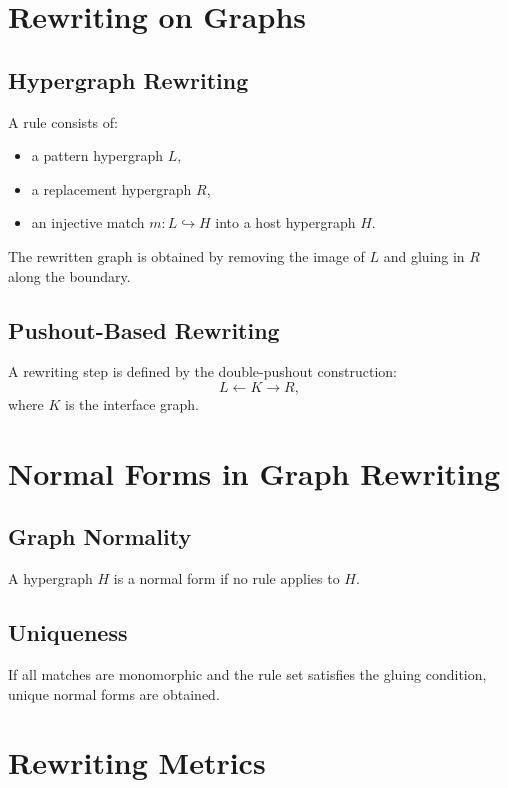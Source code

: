 \section{Rewriting on Graphs}

\subsection{Hypergraph Rewriting}

A rule consists of:
\begin{itemize}
\item a pattern hypergraph $L$,
\item a replacement hypergraph $R$,
\item an injective match $m:L\hookrightarrow H$ into a host hypergraph $H$.
\end{itemize}

The rewritten graph is obtained by removing the image of $L$ and gluing in $R$ along the boundary.

\subsection{Pushout-Based Rewriting}

A rewriting step is defined by the double-pushout construction:
\[
L \leftarrow K \rightarrow R,
\]
where $K$ is the interface graph.

\section{Normal Forms in Graph Rewriting}

\subsection{Graph Normality}

A hypergraph $H$ is a normal form if no rule applies to $H$.

\subsection{Uniqueness}

If all matches are monomorphic and the rule set satisfies the gluing condition, unique normal forms are obtained.

\section{Rewriting Metrics}

